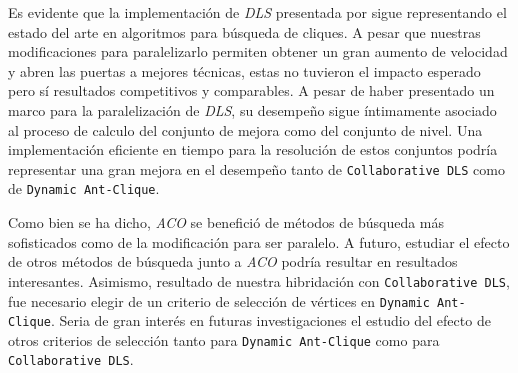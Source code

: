 \documentclass[conference]{IEEEtran}
\begin{document}
Es evidente que la implementación de \emph{DLS} presentada por
\cite{dynamicl} sigue representando el estado del arte en algoritmos
para búsqueda de cliques. A pesar que nuestras modificaciones para
paralelizarlo permiten obtener un gran aumento de velocidad y abren
las puertas a mejores técnicas, estas no tuvieron el impacto esperado
pero sí resultados competitivos y comparables. A pesar de haber
presentado un marco para la paralelización de \emph{DLS}, su desempeño
sigue íntimamente asociado al proceso de calculo del conjunto de
mejora como del conjunto de nivel. Una implementación eficiente en
tiempo para la resolución de estos conjuntos podría representar una
gran mejora en el desempeño tanto de \texttt{Collaborative DLS} como
de \texttt{Dynamic Ant-Clique}.

Como bien se ha dicho, \emph{ACO} se benefició de métodos de búsqueda
más sofisticados como de la modificación para ser paralelo. A futuro,
estudiar el efecto de otros métodos de búsqueda junto a \emph{ACO}
podría resultar en resultados interesantes. Asimismo, resultado de
nuestra hibridación con \texttt{Collaborative DLS}, fue necesario
elegir de un criterio de selección de vértices en \texttt{Dynamic
  Ant-Clique}. Seria de gran interés en futuras investigaciones el
estudio del efecto de otros criterios de selección tanto para
\texttt{Dynamic Ant-Clique} como para \texttt{Collaborative DLS}.









\end{document}
